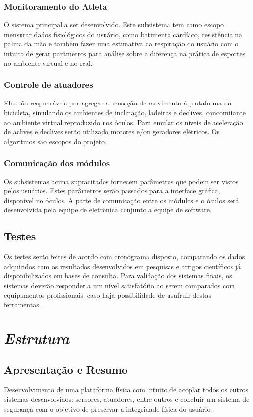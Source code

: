 \subsubsection{Monitoramento do Atleta}

O sistema principal a ser desenvolvido. Este subsistema tem como escopo mensurar dados fisiológicos do usuário, como batimento cardíaco, resistência na palma da mão e também fazer uma estimativa da respiração do usuário com o intuito de gerar parâmetros para análise sobre a diferença na prática de esportes no ambiente virtual e no real.

\subsubsection{Controle de atuadores}
Eles são responsáveis por agregar a sensação de movimento à plataforma da bicicleta, simulando os ambientes de inclinação, ladeiras e declives, concomitante ao ambiente virtual reproduzido nos óculos. Para emular os níveis de aceleração de aclives e declives serão utilizado motores e/ou geradores elétricos. Os algoritmos são escopos do projeto.

\subsubsection{Comunicação dos módulos}
Os subsistemas acima supracitados fornecem parâmetros que podem ser vistos pelos usuários. Estes parâmetros serão passados para a interface gráfica, disponível no óculos. A parte de comunicação entre os módulos e o óculos será desenvolvida pela equipe de eletrônica conjunto a equipe de software.

\subsection{Testes}
Os testes serão feitos de acordo com cronograma disposto, comparando os dados adquiridos com os resultados desenvolvidos em pesquisas e artigos científicos já disponibilizados em bases de consulta. Para validação dos sistemas finais, os sistemas deverão responder a um nível satisfatório ao serem comparados com equipamentos profissionais, caso haja possibilidade de usufruir destas ferramentas.

\section{\textit{Estrutura}}

\subsection{Apresentação e Resumo}
Desenvolvimento de uma plataforma física com intuito de acoplar todos os outros sistemas desenvolvidos: sensores, atuadores, entre outros e concluir um sistema de segurança com o objetivo de preservar a integridade física do usuário.

